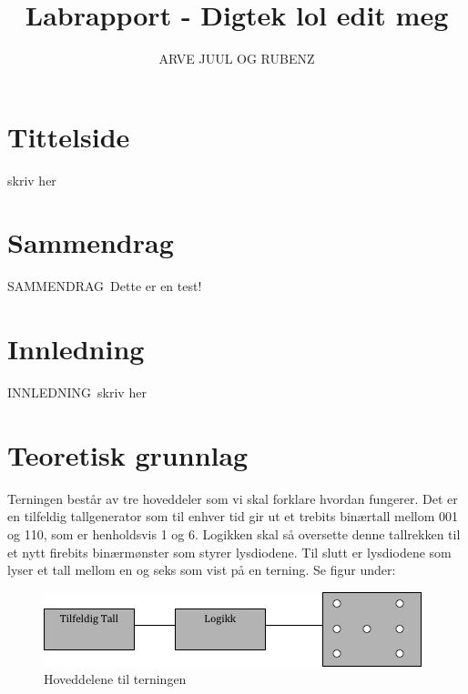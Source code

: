 \documentclass[12pt,norsk,a4paper]{article}
\begin{document}
\title{Labrapport - Digtek lol edit meg} 
\author {ARVE JUUL OG RUBENZ}

\maketitle

\clearpage



\section*{Tittelside} %
skriv her
\clearpage
\setcounter{page}{1}

\section*{Sammendrag}
SAMMENDRAG\
Dette er en test!
\clearpage %

\tableofcontents %
\clearpage

\section{Innledning} 
INNLEDNING\
skriv her
\clearpage

\section{Teoretisk grunnlag}
Terningen består av tre hoveddeler som vi skal forklare hvordan fungerer. Det er en tilfeldig tallgenerator som til enhver tid
gir ut et trebits binærtall mellom 001 og 110, som er henholdsvis 1 og 6. Logikken skal så oversette denne tallrekken til et nytt firebits binærmønster som styrer lysdiodene. Til slutt er lysdiodene som lyser et tall mellom en og seks som vist på en terning. Se figur under:
\begin{figure}[H]
\includegraphics{Blokkskjema.png}
\caption{Hoveddelene til terningen}
\label{fig:blokkskjema}
\end{figure}
\end{document}
